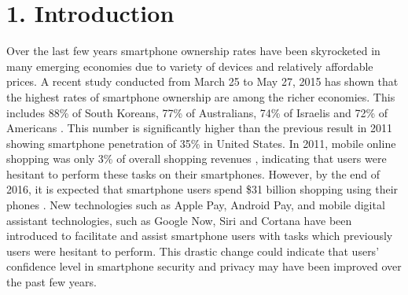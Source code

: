 \documentclass{sigchi}
\begin{document}
    
\section{1. Introduction}
Over the last few years smartphone ownership rates have been skyrocketed in many emerging economies due to variety of devices and relatively affordable prices. A recent study conducted from March 25 to May 27, 2015 has shown that the highest rates of smartphone ownership are among the richer economies. This includes 88\% of South Koreans, 77\% of Australians, 74\% of Israelis and 72\% of Americans \cite{poushter}. This number is significantly higher than the previous result in 2011 showing smartphone penetration of 35\% in United States. In 2011, mobile online shopping was only 3\% of overall shopping revenues \cite{chin2012measuring}, indicating that users were hesitant to perform these tasks on their smartphones. However, by the end of 2016, it is expected that smartphone users spend \$31 billion shopping using their phones \cite{IanBlair}. New technologies such as Apple Pay, Android Pay, and mobile digital assistant technologies, such as Google Now, Siri and Cortana have been introduced to facilitate and assist smartphone users with tasks which  previously users were hesitant to perform. This drastic change could indicate that users' confidence level in smartphone security and privacy may have been improved over the past few years.
\end{document}
